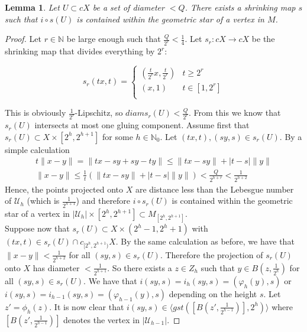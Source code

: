 \documentclass[a4paper,11pt]{article}
\theoremstyle{definition}
\theoremstyle{plain}
\newtheorem{lemma}[definition]{Lemma}
\theoremstyle{remark}
\begin{document}
{\begin{lemma} \label{weirdness} Let $U\subset cX$ be a set of diameter $<Q$. There exists a shrinking map $s$ such that $i\circ s(U)$ is contained within the geometric star of a vertex in $M$. 
\end{lemma}
\begin{proof} Let $r\in \mathbb{N}$ be large enough such that $\frac{Q}{2^r}<\frac{1}{4}$. Let $s_r: cX\rightarrow cX$ be the shrinking map that divides everything by $2^r$:


\[ s_r(tx,t) = \begin{cases} 
          (\frac{t}{2^r}x,\frac{t}{2^r}) & t \geq 2^r \\
          (x,1)& t\in [1,2^r] \\ 
       \end{cases}
    \]

This is obviously $\frac{1}{2^r}$-Lipschitz, so $diam s_r(U)<\frac{Q}{2^r}$. From this we know that $s_r(U)$ intersects at most one gluing component. Assume first that $s_r(U)\subset X \times [2^h,2^{h+1}]$ for some $h\in \mathbb{N}_{0}$. Let $(tx,t),(sy,s)\in s_r(U)$. By a simple calculation
\begin{align*}
t\|x-y\| = \|tx-sy+sy-ty\| \leq \|tx-sy\| + |t-s| \|y\|\\
\|x-y\| \leq \frac{1}{t}(\|tx-sy\| + |t-s| \|y\|) < \frac{Q}{2^{h+r}}<\frac{1}{2^{h+2}}
\end{align*}
Hence, the points projected onto $X$ are distance less than the Lebesgue number of $\mathcal{U}_{h}$ (which is $\frac{1}{2^{h+1}}$) and therefore $i\circ s_r(U)$ is contained within the geometric star of a vertex in $|\mathcal{U}_{h}| \times [2^h,2^{h+1}]\subset M_{[2^h,2^{h+1}]}$. \\

Suppose now that $s_r(U) \subset X \times (2^{h}-1,2^{h}+1)$ with $(tx,t)\in s_r(U)\cap c_{[2^{h}, 2^{h+1})}X$. By the same calculation as before, we have that $\|x-y\| < \frac{1}{2^{h+2}}$ for all $(sy,s)\in s_{r}(U)$. Therefore the projection of $s_r(U)$ onto $X$ has diameter $<\frac{1}{2^{h+1}}$.  So there exists a $z\in Z_{h}$ such that $y\in B(z,\frac{1}{2^{h}})$ for all $(sy,s)\in s_{r}(U)$. We have that $i(sy,s) = i_h(sy,s)=(\varphi_{h}(y),s)$ or $i(sy,s) = i_{h-1}(sy,s) = (\varphi_{h-1}(y),s)$ depending on the height $s$. Let $z'= \phi_{h}(z)$. It is now clear that $i(sy,s)\in \langle gst([B(z', \frac{1}{2^{h-1}})], 2^h) \rangle$ where $[B(z', \frac{1}{2^{h-1}})]$ denotes the vertex in $|\mathcal{U}_{h-1}|$.
\end{proof}

}
\end{document}
